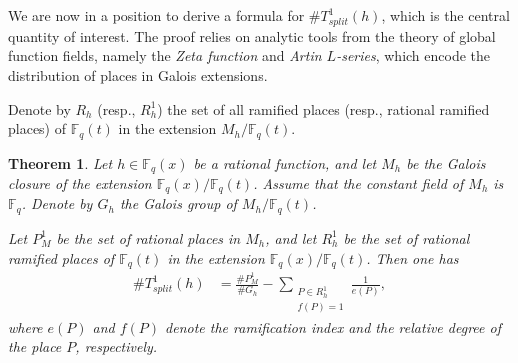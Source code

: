 \documentclass[1p,final]{elsarticle}
\newtheorem{theorem}{Theorem}[section]
\newtheorem{open problem}[theorem]{Open Problem}
\begin{document}
\medskip

We are now in a position to derive a formula for $\# T^1_{split}(h)$, which is the central quantity of interest. The proof relies on analytic tools from the theory of global function fields, namely the \emph{Zeta function} and \emph{Artin $L$-series}, which encode the distribution of places in Galois extensions.

\medskip

Denote by $R_{h}$ (resp., $R_{h}^{1}$) the set of all ramified places (resp., rational ramified places) of $\mathbb{F}_q(t)$ in the extension $M_{h}/\mathbb{F}_{q}(t)$.

\begin{theorem}\label{split}
Let $h\in\mathbb{F}_q(x)$ be a rational function, and let $M_{h}$ be the Galois closure of the extension $\mathbb{F}_q(x)/ \mathbb{F}_q(t)$. Assume that the constant field of $M_{h}$ is $\mathbb{F}_q$. Denote by $G_{h}$ the Galois group of $M_{h}/ \mathbb{F}_q(t)$.

Let $P^{1}_{M}$ be the set of rational places in $M_{h}$, and let $R_{h}^{1}$ be the set of rational ramified places of $\mathbb{F}_q(t)$ in the extension $\mathbb{F}_q(x)/ \mathbb{F}_q(t)$. Then one has
\begin{equation}
\begin{aligned}
\# T^1_{split}(h)&=\frac{\#P^1_M}{\#G_h}-\sum_{\substack{P \in R_h^1\\ f(P)=1}} \frac{1}{e(P)},
\end{aligned}
\end{equation}
where $e(P)$ and $f(P)$ denote the ramification index and the relative degree of the place $P$, respectively.
\end{theorem}
	
\end{document}
